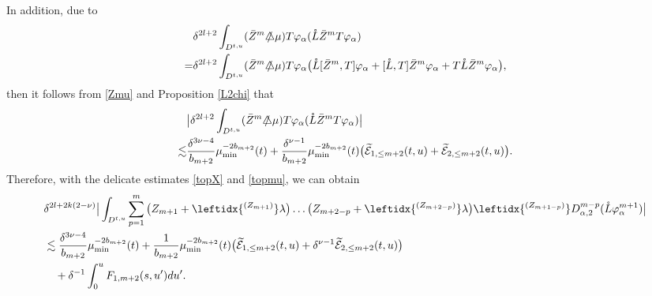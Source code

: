 \documentclass[11pt,twoside]{article}
\def\al{\alpha}
\def\vp{\varphi}
\begin{document}
\begin{enumerate}
In addition, due to
\begin{align*}
&\delta^{2l+2}\int_{D^{t, u}}(\bar Z^m\slashed\triangle\mu)T\vp_\al(\mathring L\bar Z^mT\vp_\al)\\
=&\delta^{2l+2}\int_{D^{t, u}}(\bar Z^m\slashed\triangle\mu)T\vp_\al\big(\mathring L[\bar Z^m, T]\vp_\al+[\mathring L,T]\bar Z^m\vp_\al+T\mathring L\bar Z^m\vp_{\al}\big),
\end{align*}
then it follows from \eqref{Zmu} and Proposition \ref{L2chi} that
\begin{equation}\label{topmu}
\begin{split}
&\big|\delta^{2l+2}\int_{D^{t, u}}(\bar Z^m\slashed\triangle\mu)T\vp_\al(\mathring L\bar Z^mT\vp_\al)\big|\\
\lesssim&\frac{\delta^{3\nu-4}}{b_{m+2}} \mu_{\min}^{-2b_{m+2}}(t) + \frac{\delta^{\nu-1}}{b_{m+2}} \mu_{\min}^{-2b_{m+2}}(t) \big( \widetilde{\mathcal{E}}_{1,\leq m+2}(t,u) + \widetilde{\mathcal{E}}_{2,\leq m+2}(t,u) \big).
\end{split}
\end{equation}
Therefore, with the delicate estimates \eqref{topX} and \eqref{topmu}, we can obtain
\begin{align}\label{DL2}
&\delta^{2l+2k(2-\nu)}\big|\int_{D^{t, u}}\sum_{p=1}^{m}\big(Z_{m+1}+\leftidx{^{(Z_{m+1})}}\lambda\big)\dots\big(Z_{m+2-p}
+\leftidx{^{(Z_{m+2-p})}}\lambda\big)\leftidx{^{(Z_{m+1-p})}}D_{\al,2}^{m-p}(\mathring L\varphi_\al^{m+1})\big|\notag\\
&\lesssim\frac{\delta^{3\nu-4}}{b_{m+2}} \mu_{\min}^{-2b_{m+2}}(t) + \frac{1}{b_{m+2}} \mu_{\min}^{-2b_{m+2}}(t) \big( \widetilde{\mathcal{E}}_{1,\leq m+2}(t,u) +\delta^{\nu-1} \widetilde{\mathcal{E}}_{2,\leq m+2}(t,u) \big)\\
&\quad+\delta^{-1}\int_0^uF_{1,m+2}(s,u')du'.\notag
\end{align}
\end{enumerate}
\end{document}
